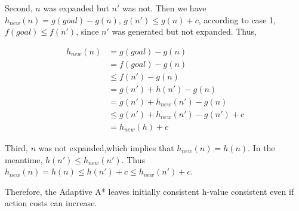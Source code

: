Second, $n$ was expanded but $n'$ was not. Then we have $h_{new}(n) = g(goal) -
g(n)$, $g(n') \leq g(n) + c $, according to case 1, $f(goal) \leq f(n')$, since
$n'$ was generated but not expanded. Thus,

\begin{equation*}
  \begin{aligned}
   h_{new}(n) &= g(goal) - g(n)\\
   &= f(goal) - g(n)\\
   &\leq f(n') -g(n)\\
   &= g(n') + h(n') -g(n)\\
   &= g(n') + h_{new}(n') -g(n)\\
   &\leq g(n') + h_{new}(n') - g(n') + c\\
   &= h_{new}(h) + c
  \end{aligned}
\end{equation*}

Third, $n$ was not expanded,which implies that $h_{new}(n) = h(n)$. In the
meantime, $h(n') \leq h_{new}(n')$. Thus $h_{new}(n) = h(n) \leq h(n') + c \leq
h_{new}(n') + c$.

Therefore, the Adaptive A* leaves initially consistent h-value consistent even
if action costs can increase.

